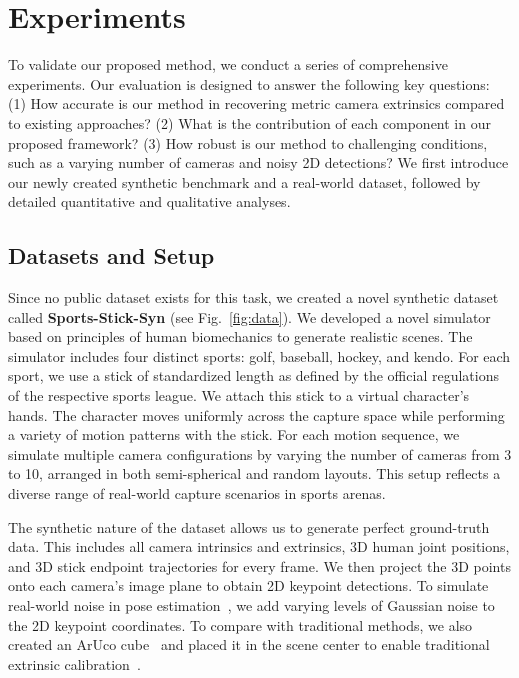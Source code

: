 \documentclass[a4paper, 10pt, conference]{ieeeconf}      %
\begin{document}
\section{Experiments}
\label{sec:exp}

To validate our proposed method, we conduct a series of comprehensive experiments. Our evaluation is designed to answer the following key questions: (1) How accurate is our method in recovering metric camera extrinsics compared to existing approaches? (2) What is the contribution of each component in our proposed framework? (3) How robust is our method to challenging conditions, such as a varying number of cameras and noisy 2D detections? We first introduce our newly created synthetic benchmark and a real-world dataset, followed by detailed quantitative and qualitative analyses. 



\subsection{Datasets and Setup}

Since no public dataset exists for this task, we created a novel synthetic dataset called \textbf{Sports-Stick-Syn} (see Fig.~\ref{fig:data}). We developed a novel simulator based on principles of human biomechanics to generate realistic scenes. The simulator includes four distinct sports: golf, baseball, hockey, and kendo. For each sport, we use a stick of standardized length as defined by the official regulations of the respective sports league. We attach this stick to a virtual character’s hands. The character moves uniformly across the capture space while performing a variety of motion patterns with the stick. For each motion sequence, we simulate multiple camera configurations by varying the number of cameras from 3 to 10, arranged in both semi-spherical and random layouts. This setup reflects a diverse range of real-world capture scenarios in sports arenas.

The synthetic nature of the dataset allows us to generate perfect ground-truth data. This includes all camera intrinsics and extrinsics, 3D human joint positions, and 3D stick endpoint trajectories for every frame. We then project the 3D points onto each camera’s image plane to obtain 2D keypoint detections. To simulate real-world noise in pose estimation~\cite{mmpose2020, yolo11_ultralytics}, we add varying levels of Gaussian noise to the 2D keypoint coordinates. To compare with traditional methods, we also created an ArUco cube~\cite{kim2018charuco} and placed it in the scene center to enable traditional extrinsic calibration~\cite{bolsee2020device, kedilioglu2025pricosa,kim2018charuco,rameau2022mc,tabb2019multi}.
\end{document}
